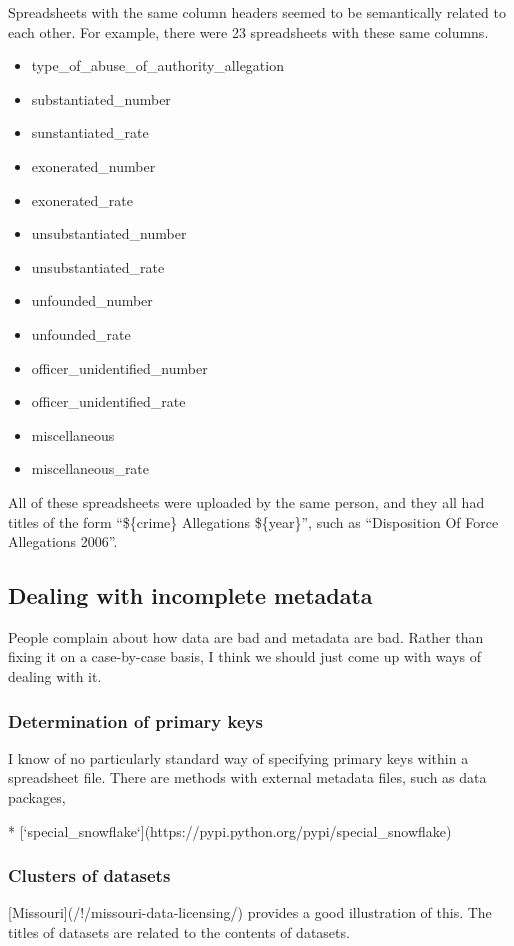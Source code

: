 \documentclass{acm_proc_article-sp}
\begin{document}
Spreadsheets with the same column headers seemed to be semantically related to
each other. For example, there were 23 spreadsheets with these same columns.
\begin{itemize}
\item type\_of\_abuse\_of\_authority\_allegation
\item substantiated\_number
\item sunstantiated\_rate
\item exonerated\_number
\item exonerated\_rate
\item unsubstantiated\_number
\item unsubstantiated\_rate
\item unfounded\_number
\item unfounded\_rate
\item officer\_unidentified\_number
\item officer\_unidentified\_rate
\item miscellaneous
\item miscellaneous\_rate
\end{itemize}

All of these spreadsheets were uploaded by the same person, and they all had
titles of the form ``\$\{crime\} Allegations \$\{year\}'', such as
``Disposition Of Force Allegations 2006''.



\subsection{Dealing with incomplete metadata}
People complain about how data are bad and metadata are bad. Rather than
fixing it on a case-by-case basis, I think we should just come up with ways
of dealing with it.

\subsubsection{Determination of primary keys}
I know of no particularly standard way of specifying primary keys within
a spreadsheet file. There are methods with external metadata files, such
as data packages\cite{datapackages},


* [`special_snowflake`](https://pypi.python.org/pypi/special_snowflake)

\subsubsection{Clusters of datasets}
[Missouri](/!/missouri-data-licensing/) provides a good illustration of this.
The titles of datasets are related to the contents of datasets.
\end{document}
